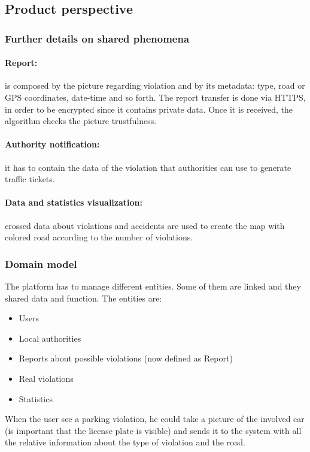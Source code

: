\subsection{Product perspective}

\subsubsection{Further details on shared phenomena}

\paragraph{Report:}
is composed by the picture regarding violation and by its metadata: type, road or GPS coordinates, date-time and so forth.
The report transfer is done via HTTPS, in order to be encrypted since it contains private data.
Once it is received, the algorithm checks the picture trustfulness.

\paragraph{Authority notification:} it has to contain the data of the violation that authorities can use to generate traffic tickets.

\paragraph{Data and statistics visualization:} crossed data about violations and accidents are used to create the map with colored road according to the number of violations.

\subsubsection{Domain model}

The platform has to manage different entities. Some of them are linked and they shared data and function.
The entities are: 
\begin{itemize}
\item Users
\item Local authorities
\item Reports about possible violations (now defined as Report)
\item Real violations
\item Statistics
\end{itemize}


When the user see a parking violation, he could take a picture of the involved car (is important that the license plate is visible) and sends it to the system with all the relative information about the type of violation and the road.

